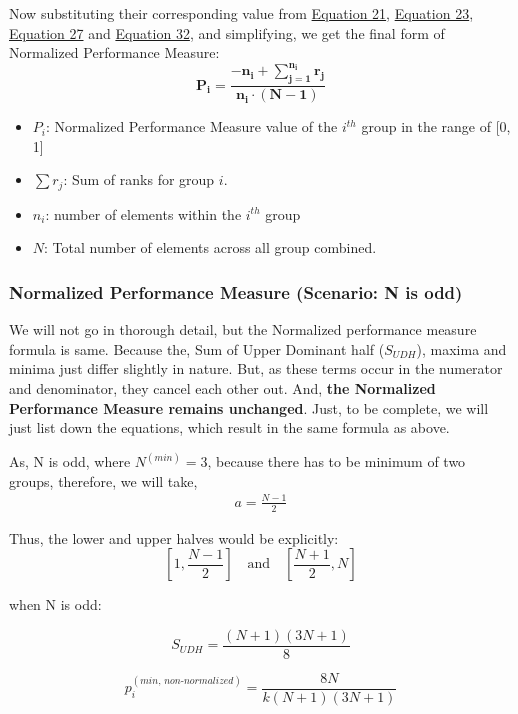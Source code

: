 \documentclass[man,floatsintext]{apa7}
\begin{document}
Now substituting their corresponding value from \hyperref[p-non-normalized]{Equation 21},  
 \hyperref[eq:even-SUDH]{Equation 23}, \hyperref[eq:minima]{Equation 27} and \hyperref[eq:maxima]{Equation 32}, and simplifying, we get the final form of Normalized Performance Measure:
\begin{equation}
	\boxed{
		\mathbf{
			P_i = \frac{-n_i +  \sum\limits_{j=1}^{n_i} r_j}{n_i \cdot (N - 1)}}
	}
\end{equation}
\begin{itemize}
	\item \textbf{$P_i$}: Normalized Performance Measure value of the $i^{th}$ group in the range of [0, 1]
	\item \textbf{$\sum r_j$}: Sum of ranks for group $i$.
	\item \textbf{$n_i$}: number of elements within the $i^{th}$ group
	\item \textbf{$N$}: Total number of elements across all group combined. \hfill \break
\end{itemize}

\subsubsection{Normalized Performance Measure (Scenario: N is odd)}
We will not go in thorough detail, but the Normalized performance measure formula is same. Because the, Sum of Upper Dominant half ($S_{UDH}$), maxima and minima just differ slightly in nature. But, as these terms occur in the numerator and denominator, they cancel each other out. And, \textbf{the Normalized Performance Measure remains unchanged}. Just, to be complete, we will just list down the equations, which result in the same formula as above.

As, N is odd, where $N^{(min)} = 3$, because there has to be minimum of two groups, therefore, we will take,
\begin{align*}
	a = \frac{N-1}{2}
\end{align*}

Thus, the lower and upper halves would be explicitly:
\[
\left[1, \frac{N-1}{2}\right] \quad \text{and} \quad \left[\frac{N+1}{2}, N\right]
\]

when N is odd:

\begin{equation}
	\label{eq:even-SUDH-odd}
	S_{UDH} = \frac{(N+1)(3N+1)}{8}
\end{equation}

\begin{equation}
	\label{eq:minima-odd}
	p_i^{(min, \, non\text{-}normalized)} = \frac{8N}{k (N+1)(3N+1)}
\end{equation}
\end{document}
